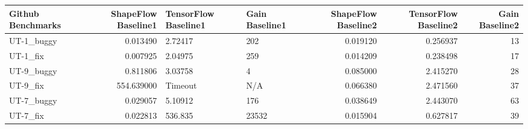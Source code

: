 \documentclass[12pt]{article}
\begin{document}
\begin{tabular}{lrllrrr}
\toprule
Github Benchmarks &  ShapeFlow Baseline1 & TensorFlow Baseline1 & Gain Baseline1 &  ShapeFlow Baseline2 &  TensorFlow Baseline2 &  Gain Baseline2 \\
\midrule
 UT-1\_buggy &             0.013490 &              2.72417 &            202 &             0.019120 &              0.256937 &              13 \\
 UT-1\_fix   &             0.007925 &              2.04975 &            259 &             0.014209 &              0.238498 &              17 \\
 UT-9\_buggy &             0.811806 &              3.03758 &              4 &             0.085000 &              2.415270 &              28 \\
 UT-9\_fix   &           554.639000 &              Timeout &            N/A &             0.066380 &              2.471560 &              37 \\
 UT-7\_buggy &             0.029057 &              5.10912 &            176 &             0.038649 &              2.443070 &              63 \\
 UT-7\_fix   &             0.022813 &              536.835 &          23532 &             0.015904 &              0.627817 &              39 \\
\bottomrule
\end{tabular}
\end{document}
